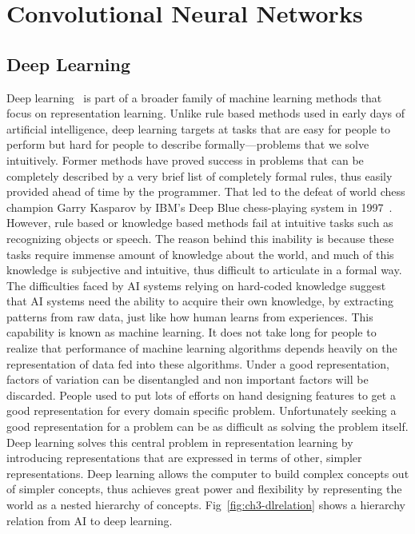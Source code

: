 \chapter{Convolutional Neural Networks}\label{sec-cnn}

\section{Deep Learning}

Deep learning~\cite{lecun2015deep, Goodfellow-et-al-2016-Book} is part of a broader family of machine learning methods that focus on representation learning. Unlike rule based methods used in early days of artificial intelligence, deep learning targets at tasks that are easy for people to perform but hard for people to describe formally---problems that we solve intuitively. Former methods have proved success in problems that can be completely described by a very brief list of completely formal rules, thus easily provided ahead of time by the programmer. That led to the defeat of world chess champion Garry Kasparov by IBM's Deep Blue chess-playing system in 1997~\cite{hsu2002behind}. However, rule based or knowledge based methods fail at intuitive tasks such as recognizing objects or speech. The reason behind this inability is because these tasks require immense amount of knowledge about the world, and much of this knowledge is subjective and intuitive, thus difficult to articulate in a formal way. The difficulties faced by AI systems relying on hard-coded knowledge suggest that AI systems need the ability to acquire their own knowledge, by extracting patterns from raw data, just like how human learns from experiences. This capability is known as machine learning. It does not take long for people to realize that performance of machine learning algorithms depends heavily on the representation of data fed into these algorithms. Under a good representation, factors of variation can be disentangled and non important factors will be discarded. People used to put lots of efforts on hand designing features to get a good representation for every domain specific problem. Unfortunately seeking a good representation for a problem can be as difficult as solving the problem itself. Deep learning solves this central problem in representation learning by introducing representations that are expressed in terms of other, simpler representations. Deep learning allows the computer to build complex concepts out of simpler concepts, thus achieves great power and flexibility by representing the world as a nested hierarchy of concepts. Fig~\ref{fig:ch3-dlrelation} shows a hierarchy relation from AI to deep learning.

